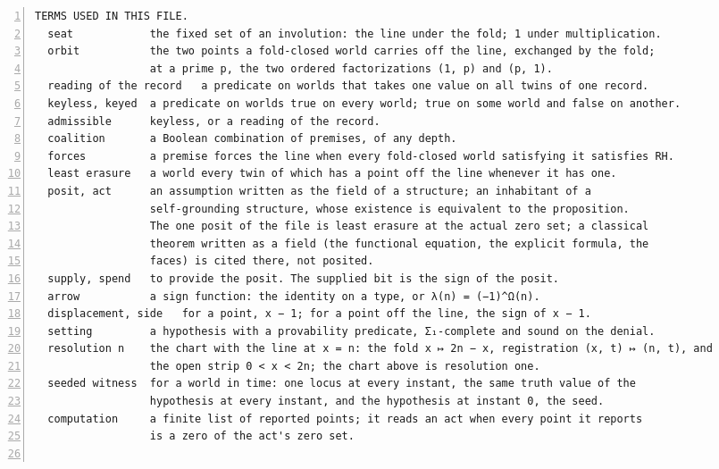 \documentclass[10pt]{article}
\newcommand{\leansize}{\fontsize{5.5pt}{6.75pt}\selectfont}
\begin{document}
\begin{multicols}{2}
\begin{Verbatim}[numbers=left,firstnumber=1,numbersep=3pt,xleftmargin=2.6em,breaklines=true,breakanywhere=true,breakautoindent=false,breakindent=1.4em,breaksymbolleft={},breakanywheresymbolpre={},fontsize=\leansize]
  TERMS USED IN THIS FILE.
  seat            the fixed set of an involution: the line under the fold; 1 under multiplication.
  orbit           the two points a fold-closed world carries off the line, exchanged by the fold;
                  at a prime p, the two ordered factorizations (1, p) and (p, 1).
  reading of the record   a predicate on worlds that takes one value on all twins of one record.
  keyless, keyed  a predicate on worlds true on every world; true on some world and false on another.
  admissible      keyless, or a reading of the record.
  coalition       a Boolean combination of premises, of any depth.
  forces          a premise forces the line when every fold-closed world satisfying it satisfies RH.
  least erasure   a world every twin of which has a point off the line whenever it has one.
  posit, act      an assumption written as the field of a structure; an inhabitant of a
                  self-grounding structure, whose existence is equivalent to the proposition.
                  The one posit of the file is least erasure at the actual zero set; a classical
                  theorem written as a field (the functional equation, the explicit formula, the
                  faces) is cited there, not posited.
  supply, spend   to provide the posit. The supplied bit is the sign of the posit.
  arrow           a sign function: the identity on a type, or λ(n) = (−1)^Ω(n).
  displacement, side   for a point, x − 1; for a point off the line, the sign of x − 1.
  setting         a hypothesis with a provability predicate, Σ₁-complete and sound on the denial.
  resolution n    the chart with the line at x = n: the fold x ↦ 2n − x, registration (x, t) ↦ (n, t), and
                  the open strip 0 < x < 2n; the chart above is resolution one.
  seeded witness  for a world in time: one locus at every instant, the same truth value of the
                  hypothesis at every instant, and the hypothesis at instant 0, the seed.
  computation     a finite list of reported points; it reads an act when every point it reports
                  is a zero of the act's zero set.


\end{Verbatim}
\end{multicols}
\end{document}
